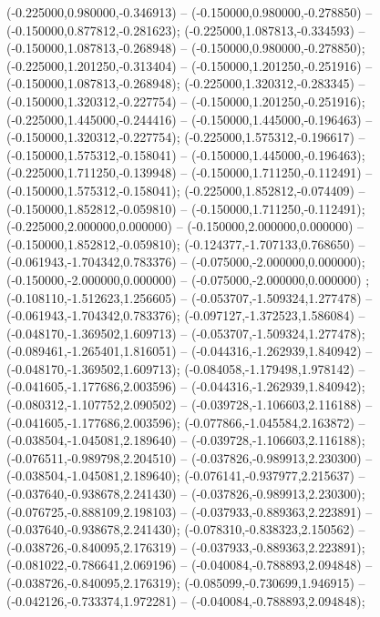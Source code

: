  (-0.225000,0.980000,-0.346913) -- (-0.150000,0.980000,-0.278850) -- (-0.150000,0.877812,-0.281623);
 (-0.225000,1.087813,-0.334593) -- (-0.150000,1.087813,-0.268948) -- (-0.150000,0.980000,-0.278850);
 (-0.225000,1.201250,-0.313404) -- (-0.150000,1.201250,-0.251916) -- (-0.150000,1.087813,-0.268948);
 (-0.225000,1.320312,-0.283345) -- (-0.150000,1.320312,-0.227754) -- (-0.150000,1.201250,-0.251916);
 (-0.225000,1.445000,-0.244416) -- (-0.150000,1.445000,-0.196463) -- (-0.150000,1.320312,-0.227754);
 (-0.225000,1.575312,-0.196617) -- (-0.150000,1.575312,-0.158041) -- (-0.150000,1.445000,-0.196463);
 (-0.225000,1.711250,-0.139948) -- (-0.150000,1.711250,-0.112491) -- (-0.150000,1.575312,-0.158041);
 (-0.225000,1.852812,-0.074409) -- (-0.150000,1.852812,-0.059810) -- (-0.150000,1.711250,-0.112491);
 (-0.225000,2.000000,0.000000) -- (-0.150000,2.000000,0.000000) -- (-0.150000,1.852812,-0.059810);
 (-0.124377,-1.707133,0.768650) -- (-0.061943,-1.704342,0.783376) -- (-0.075000,-2.000000,0.000000);
 (-0.150000,-2.000000,0.000000) -- (-0.075000,-2.000000,0.000000) ;
 (-0.108110,-1.512623,1.256605) -- (-0.053707,-1.509324,1.277478) -- (-0.061943,-1.704342,0.783376);
 (-0.097127,-1.372523,1.586084) -- (-0.048170,-1.369502,1.609713) -- (-0.053707,-1.509324,1.277478);
 (-0.089461,-1.265401,1.816051) -- (-0.044316,-1.262939,1.840942) -- (-0.048170,-1.369502,1.609713);
 (-0.084058,-1.179498,1.978142) -- (-0.041605,-1.177686,2.003596) -- (-0.044316,-1.262939,1.840942);
 (-0.080312,-1.107752,2.090502) -- (-0.039728,-1.106603,2.116188) -- (-0.041605,-1.177686,2.003596);
 (-0.077866,-1.045584,2.163872) -- (-0.038504,-1.045081,2.189640) -- (-0.039728,-1.106603,2.116188);
 (-0.076511,-0.989798,2.204510) -- (-0.037826,-0.989913,2.230300) -- (-0.038504,-1.045081,2.189640);
 (-0.076141,-0.937977,2.215637) -- (-0.037640,-0.938678,2.241430) -- (-0.037826,-0.989913,2.230300);
 (-0.076725,-0.888109,2.198103) -- (-0.037933,-0.889363,2.223891) -- (-0.037640,-0.938678,2.241430);
 (-0.078310,-0.838323,2.150562) -- (-0.038726,-0.840095,2.176319) -- (-0.037933,-0.889363,2.223891);
 (-0.081022,-0.786641,2.069196) -- (-0.040084,-0.788893,2.094848) -- (-0.038726,-0.840095,2.176319);
 (-0.085099,-0.730699,1.946915) -- (-0.042126,-0.733374,1.972281) -- (-0.040084,-0.788893,2.094848);

